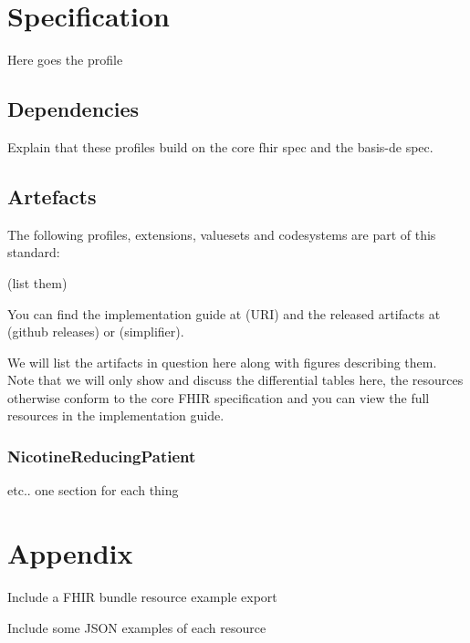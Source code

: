 \documentclass[12px]{report}
\begin{document}
\chapter{Specification}

Here goes the profile

\section{Dependencies}
Explain that these profiles build on the core fhir spec and the basis-de spec.

\section{Artefacts}
The following profiles, extensions, valuesets and codesystems are part of this standard:

(list them)

You can find the implementation guide at (URI) and the released artifacts at (github releases) or (simplifier).

We will list the artifacts in question here along with figures describing them. Note that we will only show and discuss the differential tables here, the resources otherwise conform to the core FHIR specification and you can view the full resources in the implementation guide.

\subsection{NicotineReducingPatient}

etc.. one section for each thing

\printbibliography[heading=bibintoc, title={References}]

\chapter{Appendix}

Include a FHIR bundle resource example export

Include some JSON examples of each resource
\end{document}
